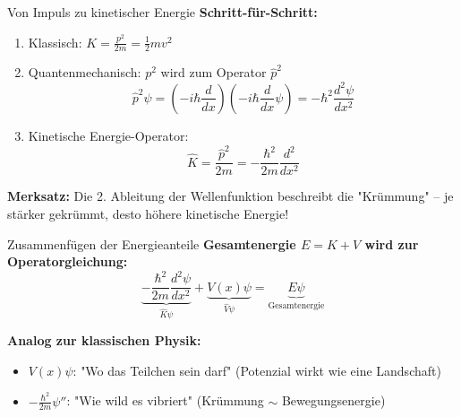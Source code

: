 \documentclass{beamer}
\begin{document}
    \begin{frame}{Von Impuls zu kinetischer Energie}
        \textbf{Schritt-für-Schritt:}
        \begin{enumerate}
            \item Klassisch: $K = \frac{p^2}{2m}=\frac{1}{2}mv^2$
            \item Quantenmechanisch: $p^2$ wird zum Operator $\hat{p}^2$
            \[
                \hat{p}^2\psi = (-i\hbar \frac{d}{dx})(-i\hbar \frac{d}{dx}\psi) = -\hbar^2 \frac{d^2\psi}{dx^2}
            \]
            \item Kinetische Energie-Operator:
            \[
                \hat{K} = \frac{\hat{p}^2}{2m} = -\frac{\hbar^2}{2m}\frac{d^2}{dx^2}
            \]
        \end{enumerate}
        \textbf{Merksatz:} Die 2.
        Ableitung der Wellenfunktion beschreibt die \alert{"Krümmung"} – je stärker gekrümmt, desto höhere kinetische Energie!
    \end{frame}

    \begin{frame}{Zusammenfügen der Energieanteile}
        \textbf{Gesamtenergie $E = K + V$ wird zur Operatorgleichung:}
        \[
            \underbrace{-\frac{\hbar^2}{2m}\frac{d^2\psi}{dx^2}}_{\hat{K}\psi} + \underbrace{V(x)\psi}_{\hat{V}\psi} = \underbrace{E\psi}_{\text{Gesamtenergie}}
        \]

        \textbf{Analog zur klassischen Physik:}
        \begin{itemize}
            \item $V(x)\psi$: "Wo das Teilchen sein darf" (Potenzial wirkt wie eine Landschaft)
            \item $-\frac{\hbar^2}{2m}\psi''$: "Wie wild es vibriert" (Krümmung $\sim$ Bewegungsenergie)
        \end{itemize}
    \end{frame}
\end{document}
